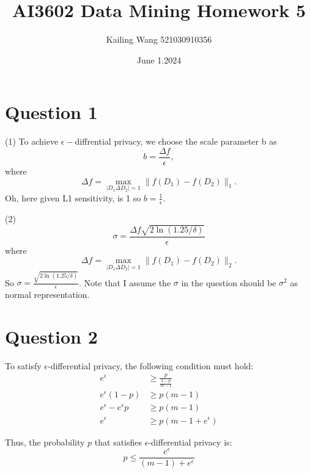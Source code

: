 \documentclass{article}
\begin{document}
\title{AI3602 Data Mining Homework 5}
\author{Kailing Wang 521030910356}
\date{June 1.2024}
\maketitle

\section*{Question 1}

(1)
To achieve $\epsilon-$diffrential privacy, we choose the scale parameter b as
\begin{equation}
	b = \frac{\Delta f}{\epsilon},
\end{equation}
where
\begin{equation}
	\Delta f = \max_{|D_1 \Delta D_2| = 1} \| f(D_1) - f(D_2) \|_1.
\end{equation}
Oh, here given L1 sensitivity, is 1 so $b = \frac{1}{\epsilon}$.

\noindent(2)
\begin{equation}
	\sigma = \frac{\Delta f \sqrt{2\ln(1.25/\delta)}}{\epsilon}
\end{equation}
where
\begin{equation}
	\Delta f = \max_{|D_1 \Delta D_2| = 1} \| f(D_1) - f(D_2) \|_2.
\end{equation}
So $\sigma = \frac{\sqrt{2\ln(1.25/\delta)}}{\epsilon}$. Note that I assume the $\sigma$ in the question should be $\sigma^2$ as normal representation.

\section*{Question 2}

To satisfy \(\epsilon\)-differential privacy, the following condition must hold:
\begin{align}
e^\epsilon &\geq \frac{p}{\frac{1 - p}{m - 1}} \\
e^\epsilon (1 - p) &\geq p (m - 1) \\
e^\epsilon - e^\epsilon p &\geq p (m - 1) \\
e^\epsilon &\geq p (m - 1 + e^\epsilon)
\end{align}

Thus, the probability \(p\) that satisfies \(\epsilon\)-differential privacy is:
\begin{equation}
p \leq \frac{e^\epsilon}{(m - 1) + e^\epsilon}
\end{equation}
\end{document}
